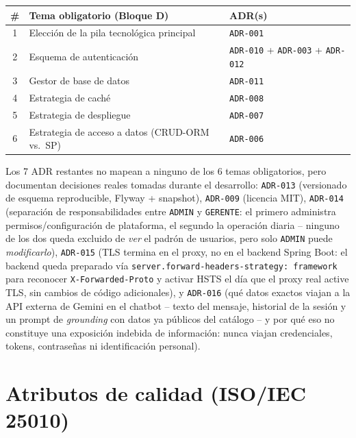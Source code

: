 \begin{center}
\small
\begin{tabularx}{\linewidth}{|c|X|l|}
\hline
\rowcolor{verdeuteq}
\color{white}\textbf{\#} & \color{white}\textbf{Tema obligatorio (Bloque D)} & \color{white}\textbf{ADR(s)} \\
\hline
1 & Elección de la pila tecnológica principal & \texttt{ADR-001} \\
\hline
2 & Esquema de autenticación & \texttt{ADR-010} + \texttt{ADR-003} + \texttt{ADR-012} \\
\hline
3 & Gestor de base de datos & \texttt{ADR-011} \\
\hline
4 & Estrategia de caché & \texttt{ADR-008} \\
\hline
5 & Estrategia de despliegue & \texttt{ADR-007} \\
\hline
6 & Estrategia de acceso a datos (CRUD-ORM vs.\ SP) & \texttt{ADR-006} \\
\hline
\end{tabularx}
\end{center}

Los 7 ADR restantes no mapean a ninguno de los 6 temas obligatorios,
pero documentan decisiones reales tomadas durante el desarrollo:
\texttt{ADR-013} (versionado de esquema reproducible, Flyway + snapshot),
\texttt{ADR-009} (licencia MIT), \texttt{ADR-014} (separación de
responsabilidades entre \texttt{ADMIN} y \texttt{GERENTE}: el primero
administra permisos/configuración de plataforma, el segundo la operación
diaria -- ninguno de los dos queda excluido de \emph{ver} el padrón de
usuarios, pero solo \texttt{ADMIN} puede \emph{modificarlo}),
\texttt{ADR-015} (TLS termina en el proxy, no en el backend Spring
Boot: el backend queda preparado vía
\texttt{server.forward-headers-strategy: framework} para reconocer
\texttt{X-Forwarded-Proto} y activar HSTS el día que el proxy real
active TLS, sin cambios de código adicionales), y \texttt{ADR-016}
(qué datos exactos viajan a la API externa de Gemini en el chatbot --
texto del mensaje, historial de la sesión y un prompt de
\emph{grounding} con datos ya públicos del catálogo -- y por qué eso no
constituye una exposición indebida de información: nunca viajan
credenciales, tokens, contraseñas ni identificación personal).

\section{Atributos de calidad (ISO/IEC 25010)}

